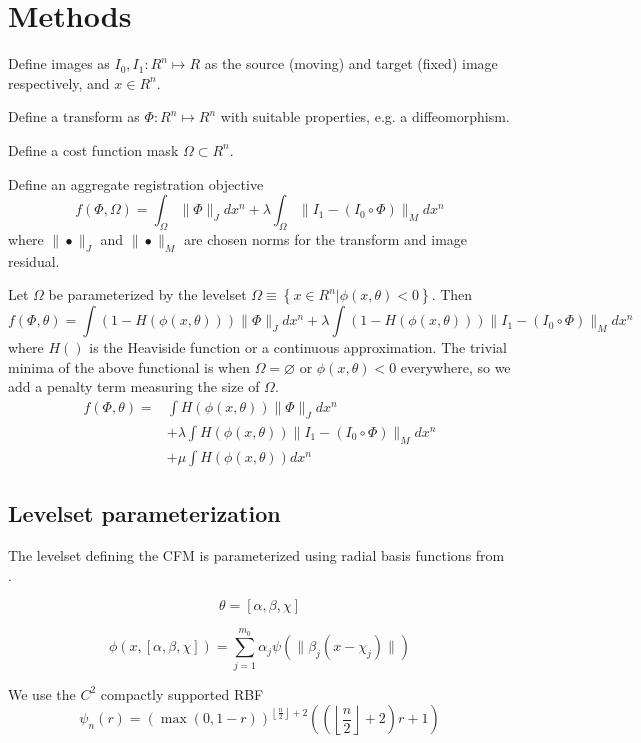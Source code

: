 \documentclass[preprint,review,12pt]{elsarticle}
\begin{document}
\section{Methods}
Define images as $I_0, I_1 : R^n \mapsto R$ as the source (moving) and
target (fixed) image respectively, and $x \in R^n$.
\par
Define a transform as $\Phi : R^n \mapsto R^n$ with suitable
properties, e.g. a diffeomorphism.
\par
Define a cost function mask $\Omega \subset R^n$.
\par
Define an aggregate registration objective
\[
f(\Phi,\Omega) = \int_\Omega \|\Phi\|_J dx^n + \lambda \int_\Omega \|
I_1 - (I_0 \circ \Phi) \|_M dx^n
\]
where $\|\bullet\|_J$ and $\|\bullet\|_M$ are chosen norms for the transform and image residual. 
\par
Let $\Omega$ be parameterized by the levelset $\Omega \equiv \left\{
  x\in R^n | \phi(x,\theta) < 0 \right\}$. Then
\[
f(\Phi,\theta) = \int (1- H(\phi(x,\theta)))\|\Phi\|_J dx^n + \lambda \int (1-H(\phi(x,\theta)))\|
I_1 - (I_0 \circ \Phi) \|_M dx^n
\]
where $H()$ is the Heaviside function or a continuous
approximation. The trivial minima of the above functional is when
$\Omega = \varnothing$ or $\phi(x,\theta) < 0$ everywhere, so we add a penalty term
measuring the size of $\Omega$.
\begin{eqnarray*}
f(\Phi,\theta) = & \int H(\phi(x,\theta))\|\Phi\|_J dx^n \\
& + \lambda \int H(\phi(x,\theta))\|I_1 - (I_0 \circ \Phi) \|_M dx^n \\
& + \mu \int H(\phi(x,\theta)) dx^n
\end{eqnarray*}

\subsection{Levelset parameterization}
The levelset defining the CFM is parameterized using radial basis
functions from \cite{Aghasi2011}.

\[
\theta = [\alpha, \beta, \chi]
\] 

\[
\phi(x,[\alpha, \beta, \chi]) = \sum_{j = 1}^{m_0} \alpha_j
\psi(\|\beta_j(x - \chi_j)\|) 
\]

We use the $C^2$ compactly supported RBF
\[
\psi_{n}(r) = \left ( \max{\left ( 0,1 - r \right )} \right )^{\left\lfloor
  \frac{n}{2}\right\rfloor + 2}\left ( \left ( \left\lfloor
  \frac{n}{2}\right\rfloor + 2 \right ) r+1 \right ) 
\]
\end{document}
